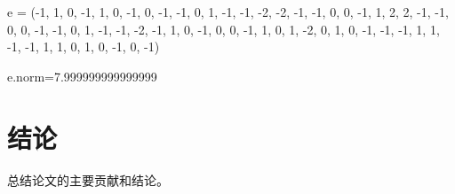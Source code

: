 \documentclass[12pt,a4paper]{article}
\numberwithin{equation}{section}
\begin{document}
\hspace*{\fill}

e = (-1, 1, 0, -1, 1, 0, -1, 0, -1, -1, 0, 1, -1, -1, -2, -2, -1, -1, 0, 0, -1, 1, 2, 2, -1,
-1, 0, 0, -1, -1, 0, 1, -1, -1, -2, -1, 1, 0, -1, 0, 0, -1, 1, 0, 1, -2, 0, 1, 0, -1, -1,
-1, 1, 1, -1, -1, 1, 1, 0, 1, 0, -1, 0, -1)

e.norm=7.999999999999999

\section{结论}

总结论文的主要贡献和结论。

\vspace{1em}

{\songti\fontsize{12pt}{18pt}\selectfont
	
}
\end{document}
